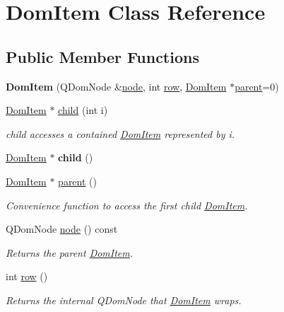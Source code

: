 \hypertarget{classDomItem}{}\section{Dom\+Item Class Reference}
\label{classDomItem}
\subsection*{Public Member Functions}
\begin{DoxyCompactItemize}
\item 
\mbox{\label{classDomItem_ab7b614325927474e2ffe492984b0ba93}} 
{\bfseries Dom\+Item} (Q\+Dom\+Node \&\hyperlink{classDomItem_a29a7202350961e4640a895ebc1daf3a0}{node}, int \hyperlink{classDomItem_ad08a9979184909d70fb2f5000dd5a7b9}{row}, \hyperlink{classDomItem}{Dom\+Item} $\ast$\hyperlink{classDomItem_abba8216c2555c524a9ac662834019c30}{parent}=0)
\item 
\hyperlink{classDomItem}{Dom\+Item} $\ast$ \hyperlink{classDomItem_af1f0d64a01b07fce3d310fe71da81ca7}{child} (int i)
\begin{DoxyCompactList}\small\item\em child accesses a contained \hyperlink{classDomItem}{Dom\+Item} represented by i. \end{DoxyCompactList}\item 
\mbox{\label{classDomItem_a30a370dc17a163568065288050ce2c37}} 
\hyperlink{classDomItem}{Dom\+Item} $\ast$ {\bfseries child} ()
\item 
\mbox{\label{classDomItem_abba8216c2555c524a9ac662834019c30}} 
\hyperlink{classDomItem}{Dom\+Item} $\ast$ \hyperlink{classDomItem_abba8216c2555c524a9ac662834019c30}{parent} ()
\begin{DoxyCompactList}\small\item\em Convenience function to access the first child \hyperlink{classDomItem}{Dom\+Item}. \end{DoxyCompactList}\item 
\mbox{\label{classDomItem_a29a7202350961e4640a895ebc1daf3a0}} 
Q\+Dom\+Node \hyperlink{classDomItem_a29a7202350961e4640a895ebc1daf3a0}{node} () const
\begin{DoxyCompactList}\small\item\em Returns the parent \hyperlink{classDomItem}{Dom\+Item}. \end{DoxyCompactList}\item 
\mbox{\label{classDomItem_ad08a9979184909d70fb2f5000dd5a7b9}} 
int \hyperlink{classDomItem_ad08a9979184909d70fb2f5000dd5a7b9}{row} ()
\begin{DoxyCompactList}\small\item\em Returns the internal Q\+Dom\+Node that \hyperlink{classDomItem}{Dom\+Item} wraps. \end{DoxyCompactList}\end{DoxyCompactItemize}


